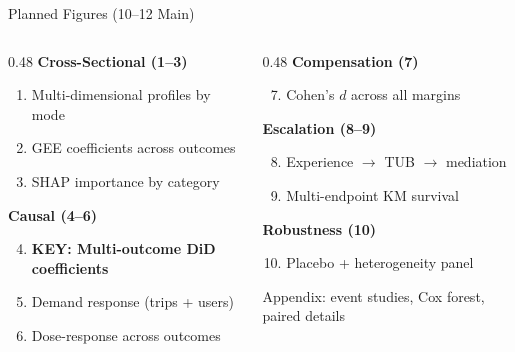 \documentclass[aspectratio=169, 11pt]{beamer}
\begin{document}
\begin{frame}{Planned Figures (10--12 Main)}
\small
\begin{columns}[T]
\begin{column}{0.48\textwidth}
\textbf{\color{PhaseBlue}Cross-Sectional (1--3)}
\begin{enumerate}
\item Multi-dimensional profiles by mode
\item GEE coefficients across outcomes
\item SHAP importance by category
\end{enumerate}
\textbf{\color{PhaseOrange}Causal (4--6)}
\begin{enumerate}\setcounter{enumi}{3}
\item \textbf{KEY: Multi-outcome DiD coefficients}
\item Demand response (trips + users)
\item Dose-response across outcomes
\end{enumerate}
\end{column}
\begin{column}{0.48\textwidth}
\textbf{\color{PhasePurple}Compensation (7)}
\begin{enumerate}\setcounter{enumi}{6}
\item Cohen's $d$ across all margins
\end{enumerate}
\textbf{\color{AccentGreen}Escalation (8--9)}
\begin{enumerate}\setcounter{enumi}{7}
\item Experience $\to$ TUB $\to$ mediation
\item Multi-endpoint KM survival
\end{enumerate}
\textbf{\color{gray}Robustness (10)}
\begin{enumerate}\setcounter{enumi}{9}
\item Placebo + heterogeneity panel
\end{enumerate}

{\footnotesize\color{gray}Appendix: event studies, Cox forest, paired details}
\end{column}
\end{columns}
\end{frame}
\end{document}
